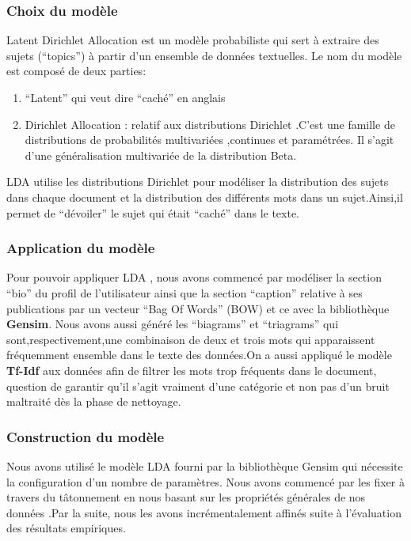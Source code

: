\documentclass[12pt]{extarticle}
\begin{document}
\subsubsection{Choix du modèle }
Latent Dirichlet Allocation  est un modèle probabiliste qui sert à extraire des sujets (“topics”) à partir d’un ensemble de données textuelles.  Le nom du modèle est composé de deux parties:
\begin{enumerate}
    \item “Latent” qui veut dire “caché” en anglais
    \item Dirichlet Allocation : relatif aux distributions Dirichlet .C’est une famille de distributions de probabilités multivariées ,continues et paramétrées. Il s’agit d’une généralisation multivariée de la distribution Beta.
\end{enumerate}
LDA utilise les distributions Dirichlet pour modéliser la distribution des sujets dans chaque document et la distribution des différents mots dans un sujet.Ainsi,il permet de “dévoiler” le sujet qui était “caché” dans le texte.
\subsubsection{Application du modèle}
Pour pouvoir appliquer  LDA , nous avons commencé par modéliser la section “bio” du profil de l’utilisateur ainsi que la  section  “caption” relative  à ses  publications par un vecteur “Bag Of Words” (BOW) et ce avec la bibliothèque \textbf{Gensim}. Nous avons aussi généré les “biagrams” et “triagrams” qui sont,respectivement,une combinaison de  deux et trois mots qui apparaissent fréquemment ensemble dans le texte des données.On a aussi appliqué le modèle \textbf{Tf-Idf} aux données afin de filtrer les mots trop fréquents dans le document, question de garantir qu’il s’agit vraiment d’une catégorie et non pas d’un bruit maltraité dès la phase de nettoyage.
\subsubsection{Construction du modèle}
Nous avons utilisé le modèle LDA fourni par  la bibliothèque Gensim qui  nécessite la configuration d’un nombre de paramètres.
Nous avons commencé par les fixer à travers du tâtonnement  en nous  basant sur les propriétés générales de nos données .Par la suite, nous les avons incrémentalement  affinés suite à l’évaluation des résultats empiriques.
\end{document}
